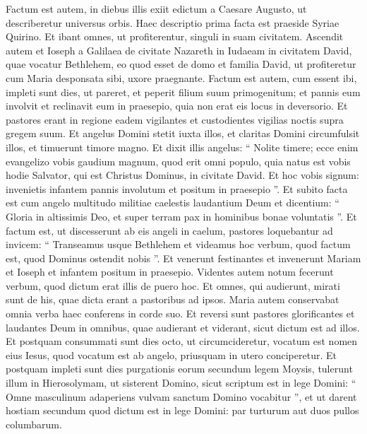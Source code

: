 \begin{biblechapter}
\begin{biblechapter}
\verse Factum est autem, in diebus illis exiit edictum a Caesare Augusto, ut describeretur universus orbis. 
\verse Haec descriptio prima facta est praeside Syriae Quirino. 
\verse Et ibant omnes, ut profiterentur, singuli in suam civitatem. 
\verse Ascendit autem et Ioseph a Galilaea de civitate Nazareth in Iudaeam in civitatem David, quae vocatur Bethlehem, eo quod esset de domo et familia David, 
\verse ut profiteretur cum Maria desponsata sibi, uxore praegnante. 
\verse Factum est autem, cum essent ibi, impleti sunt dies, ut pareret, 
\verse et peperit filium suum primogenitum; et pannis eum involvit et reclinavit eum in praesepio, quia non erat eis locus in deversorio.
 \verse Et pastores erant in regione eadem vigilantes et custodientes vigilias noctis supra gregem suum. 
\verse Et angelus Domini stetit iuxta illos, et claritas Domini circumfulsit illos, et timuerunt timore magno. 
\verse Et dixit illis angelus: “ Nolite timere; ecce enim evangelizo vobis gaudium magnum, quod erit omni populo, 
\verse quia natus est vobis hodie Salvator, qui est Christus Dominus, in civitate David. 
\verse Et hoc vobis signum: invenietis infantem pannis involutum et positum in praesepio ”. 
\verse Et subito facta est cum angelo multitudo militiae caelestis laudantium Deum et dicentium:
 \verse “ Gloria in altissimis Deo,
 et super terram pax in hominibus bonae voluntatis ”.
 \verse Et factum est, ut discesserunt ab eis angeli in caelum, pastores loquebantur ad invicem: “ Transeamus usque Bethlehem et videamus hoc verbum, quod factum est, quod Dominus ostendit nobis ”. 
\verse Et venerunt festinantes et invenerunt Mariam et Ioseph et infantem positum in praesepio. 
\verse Videntes autem notum fecerunt verbum, quod dictum erat illis de puero hoc. 
\verse Et omnes, qui audierunt, mirati sunt de his, quae dicta erant a pastoribus ad ipsos. 
\verse Maria autem conservabat omnia verba haec conferens in corde suo.
 \verse Et reversi sunt pastores glorificantes et laudantes Deum in omnibus, quae audierant et viderant, sicut dictum est ad illos.
 \verse Et postquam consummati sunt dies octo, ut circumcideretur, vocatum est nomen eius Iesus, quod vocatum est ab angelo, priusquam in utero conciperetur.
 \verse Et postquam impleti sunt dies purgationis eorum secundum legem Moysis, tulerunt illum in Hierosolymam, ut sisterent Domino, 
\verse sicut scriptum est in lege Domini: “ Omne masculinum adaperiens vulvam sanctum Domino vocabitur ”, 
\verse et ut darent hostiam secundum quod dictum est in lege Domini: par turturum aut duos pullos columbarum.

\end{biblechapter}
\end{biblechapter}
